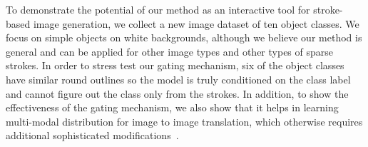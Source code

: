 To demonstrate the potential of our method as an interactive tool for stroke-based image generation, we collect a new image dataset of ten object classes. We focus on simple objects on white backgrounds, although we believe our method is general and can be applied for other image types and other types of sparse strokes. In order to stress test our gating mechanism, six  of the object classes have similar round outlines so the model is truly conditioned on the class label and cannot figure out the class only from the strokes. In addition, to show the effectiveness of the gating mechanism, we also show that it helps in learning multi-modal distribution for image to image translation, which otherwise requires additional sophisticated modifications~\cite{zhu2017toward,ghosh2017multi}.


